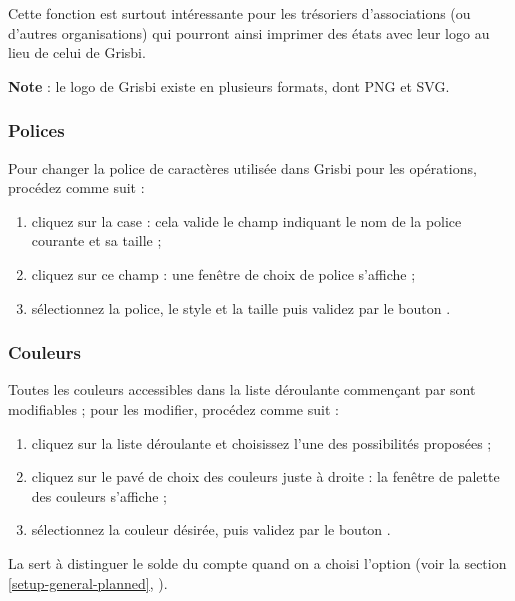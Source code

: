 Cette fonction est surtout intéressante pour les trésoriers d'associations (ou d'autres organisations) qui pourront ainsi imprimer des états avec leur logo au lieu de celui de Grisbi.

\textbf{Note} : le logo de Grisbi existe en plusieurs formats, dont \gls{PNG} et \gls{SVG}.


\subsubsection{Polices\label{setup-display-logo-fonts}}

Pour changer la police de caractères utilisée dans Grisbi pour les opérations, procédez comme suit :

\begin{enumerate}
	\item cliquez sur la case  : cela valide le champ indiquant le nom de la police courante et sa taille ;
	\item cliquez sur ce champ : une fenêtre de choix de police s'affiche ;
	\item sélectionnez la police, le style et la taille puis validez par le bouton .
\end{enumerate}


\subsubsection{Couleurs\label{setup-display-logo-colors}}

Toutes les couleurs accessibles dans la liste déroulante commençant par  sont modifiables ; pour les modifier,  procédez comme suit :

\begin{enumerate}
	\item cliquez sur la liste déroulante et choisissez l'une des possibilités proposées ;
	\item cliquez sur le pavé de choix des couleurs juste à droite : la fenêtre de palette des couleurs s'affiche ;
	\item sélectionnez la couleur désirée, puis validez par le bouton .
\end{enumerate}

La  sert à distinguer le solde du compte quand on a choisi l'option  (voir la section \vref{setup-general-planned}, ).

